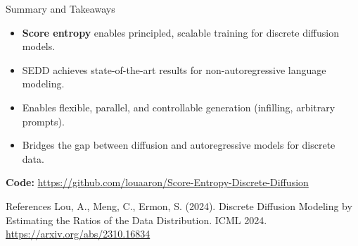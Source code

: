 \documentclass{beamer}
\begin{document}
\begin{frame}{Summary and Takeaways}
  \begin{itemize}
    \item \textbf{Score entropy} enables principled, scalable training for discrete diffusion models.
    \item SEDD achieves state-of-the-art results for non-autoregressive language modeling.
    \item Enables flexible, parallel, and controllable generation (infilling, arbitrary prompts).
    \item Bridges the gap between diffusion and autoregressive models for discrete data.
  \end{itemize}
  \vspace{1em}
  \textbf{Code:} \url{https://github.com/louaaron/Score-Entropy-Discrete-Diffusion}
\end{frame}

\begin{frame}{References}
  Lou, A., Meng, C., Ermon, S. (2024). Discrete Diffusion Modeling by Estimating the Ratios of the Data Distribution. ICML 2024.\\
  \url{https://arxiv.org/abs/2310.16834}
\end{frame}
\end{document}
